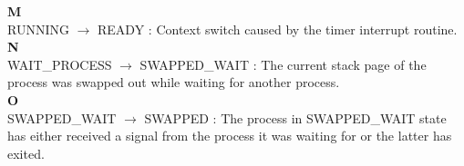 \textbf{M}\\
RUNNING $\rightarrow$ READY : Context switch caused by the timer interrupt routine.\\

\textbf{N}\\
WAIT\_PROCESS $\rightarrow$ SWAPPED\_WAIT : The current stack page of the process was swapped out while waiting for another process.\\

\textbf{O}\\
SWAPPED\_WAIT $\rightarrow$ SWAPPED : The process in SWAPPED\_WAIT state has either received a signal from the process it was waiting for or the latter has exited.


